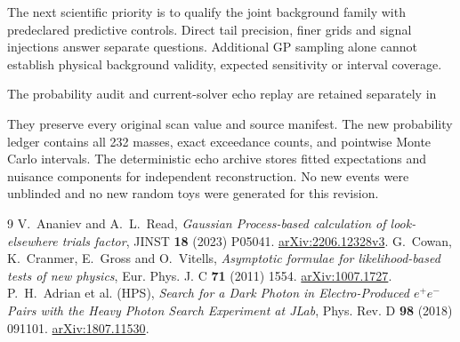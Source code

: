 \documentclass[11pt]{article}
\begin{document}
The next scientific priority is to qualify the joint background family with predeclared predictive controls. Direct tail precision, finer grids and signal injections answer separate questions. Additional GP sampling alone cannot establish physical background validity, expected sensitivity or interval coverage.

The probability audit and current-solver echo replay are retained separately in
\begin{center}\small{}\end{center}
They preserve every original scan value and source manifest. The new probability ledger contains all 232 masses, exact exceedance counts, and pointwise Monte Carlo intervals. The deterministic echo archive stores fitted expectations and nuisance components for independent reconstruction. No new events were unblinded and no new random toys were generated for this revision.

\clearpage
\begingroup
\def\lowmassfigurepath{../../v4p9p16_2015_lowmass_side_study_20260906/figures}

\endgroup

\clearpage
\begin{thebibliography}{9}
 V.~Ananiev and A.~L.~Read, \emph{Gaussian Process-based calculation of look-elsewhere trials factor}, JINST \textbf{18} (2023) P05041. \href{https://arxiv.org/abs/2206.12328v3}{arXiv:2206.12328v3}.
 G.~Cowan, K.~Cranmer, E.~Gross and O.~Vitells, \emph{Asymptotic formulae for likelihood-based tests of new physics}, Eur. Phys. J. C \textbf{71} (2011) 1554. \href{https://arxiv.org/abs/1007.1727}{arXiv:1007.1727}.
 P.~H.~Adrian et al. (HPS), \emph{Search for a Dark Photon in Electro-Produced $e^+e^-$ Pairs with the Heavy Photon Search Experiment at JLab}, Phys. Rev. D \textbf{98} (2018) 091101. \href{https://arxiv.org/abs/1807.11530}{arXiv:1807.11530}.
\end{thebibliography}
\end{document}
